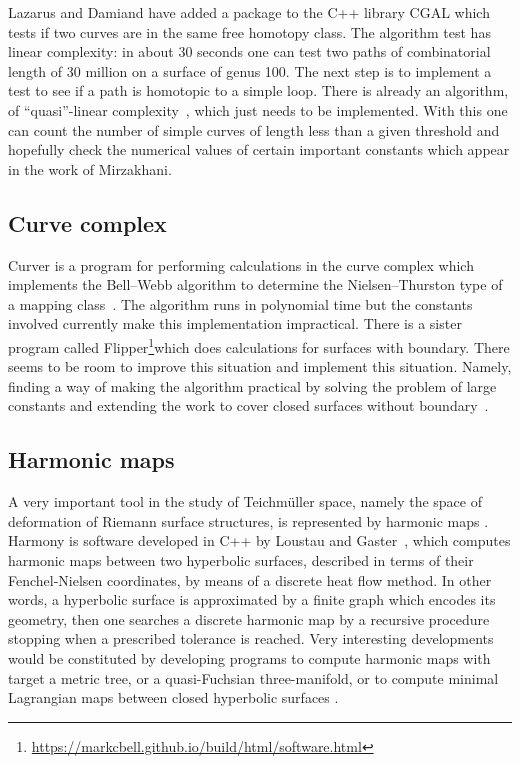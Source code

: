 \documentclass[14pt,fleqn]{article}
\begin{document}
Lazarus and Damiand have
added a package to the C++ library  CGAL which tests if two curves are
in the same free homotopy class. The algorithm test has linear
complexity: in about 30 seconds one can test two paths of
combinatorial length of 30 million on a surface of genus
100. The next step is to implement a test to see if a path
is homotopic to a simple loop. There is already an algorithm, of
“quasi”-linear complexity~\cite{dl-cginc-19}, which just needs to be implemented. With
this one can count the number of simple curves of length less than a given threshold 
and hopefully check the numerical values of certain important constants which
appear in the work of Mirzakhani.


\subsection{Curve complex}

Curver is a program for
performing calculations in the curve complex which implements the
Bell–Webb algorithm to determine the Nielsen–Thurston type of a
mapping class~\cite{b-c-17,b-esmt-19}. The algorithm runs in polynomial time but the constants
involved currently make this implementation impractical. There is a
sister program called Flipper\footnote{\url{https://markcbell.github.io/build/html/software.html}}which does calculations for surfaces
with boundary. There seems to be room to improve this situation and
implement this situation. Namely, finding a way of making the
algorithm practical by solving the problem of large constants and
extending the work to cover closed surfaces without boundary~\cite{mm-sosr-19}.

\subsection{Harmonic maps}

A very important tool in the study of Teichm\" {u}ller space, namely the
space of deformation of Riemann surface structures, is represented by
harmonic maps \cite{wolf}. Harmony is  software developed in C++ by
Loustau and Gaster~\cite{glm-cdehm-18}, which computes harmonic maps between two
hyperbolic surfaces, described in terms of their Fenchel-Nielsen
coordinates, by means of a discrete heat flow method. In other words,
a hyperbolic surface is 
approximated by a finite graph 
which encodes its geometry, 
then one searches a discrete harmonic 
map by a  recursive procedure 
stopping when  a prescribed tolerance is reached. 
Very interesting developments would be
constituted by developing programs to compute harmonic maps with
target a metric tree, or a quasi-Fuchsian three-manifold, or to
compute minimal Lagrangian maps between closed hyperbolic surfaces \cite{BS}.
\end{document}
